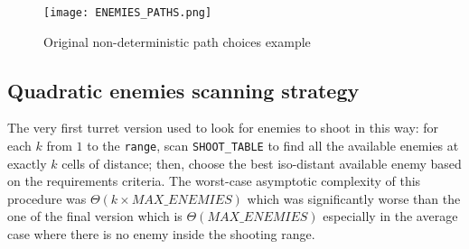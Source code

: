 \documentclass[
10pt, %
a4paper, %
oneside, %
headinclude,footinclude, %
BCOR5mm, %
]{scrartcl}
\begin{document}
			\begin{figure}[h!]
				\centering
				\texttt{[image: ENEMIES\_PATHS.png]}
				\caption{Original non-deterministic path choices example}
			\end{figure}
		\subsection{Quadratic enemies scanning strategy}
			The very first turret version used to look for enemies to shoot in this way: for each $k$ from $1$ to the \texttt{range}, scan \texttt{SHOOT\_TABLE} to find all the available enemies at exactly $k$ cells of distance; then, choose the best iso-distant available enemy based on the requirements criteria. The worst-case asymptotic complexity of this procedure was $\Theta(k\times MAX\_ENEMIES)$ which was significantly worse than the one of the final version which is $\Theta(MAX\_ENEMIES)$ especially in the average case where there is no enemy inside the shooting range.
\end{document}
